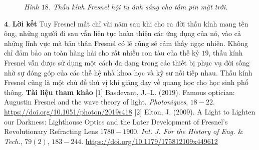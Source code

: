 \begin{multicols}{2}
\begin{figure}[H]
		\caption{\small\textit{\color{timhieukhoahoc}Hình $18$. Thấu kính Fresnel hội tụ ánh sáng cho tấm pin mặt trời.}}
		\vspace*{-10pt}
	\end{figure}
	$\pmb{4.}$ \textbf{\color{timhieukhoahoc}Lời kết}
	\vskip 0.1cm
	Tuy Fresnel mất chỉ vài năm sau khi cho ra đời thấu kính mang tên ông, những người đi sau vẫn liên tục hoàn thiện các ứng dụng của nó, vào cả những lĩnh vực mà bản thân Fresnel có lẽ cũng sẽ cảm thấy ngạc nhiên. Không chỉ đảm bảo an toàn hàng hải cho rất nhiều con tàu của thế kỷ $19$, thấu kính Fresnel vẫn được sử dụng một cách đa dạng trong các thiết bị phục vụ đời sống nhờ sự đóng góp của các thế hệ nhà khoa học và kỹ sư nối tiếp nhau. Thấu kính Fresnel cũng là một chủ đề thú vị khi giảng dạy về quang học cho học sinh phổ thông. 
	\vskip 0.1cm
	\textbf{\color{timhieukhoahoc}Tài liệu tham khảo}
	\vskip 0.1cm
	[$1$] Basdevant, J.--L. ($2019$). Famous optician: Augustin Fresnel and the wave theory of light. \textit{Photoniques}, $18-22$. \url{https://doi.org/10.1051/photon/2019s418}
	\vskip 0.1cm
	[$2$] Elton, J. ($2009$). A Light to Lighten our Darkness: Lighthouse Optics and the Later Development of Fresnel's Revolutionary Refracting Lens $1780-1900$. \textit{Int. J. For the History of Eng. $\&$ Tech.}, $79(2)$, $183-244$.
	 \url{https://doi.org/10.1179/175812109x449612}
\end{multicols}